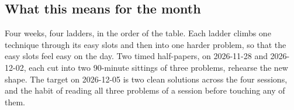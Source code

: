 \subsection*{What this means for the month}

Four weeks, four ladders, in the order of the table. Each ladder climbs one technique through its easy slots and then into one harder problem, so that the easy slots feel easy on the day. Two timed half-papers, on 2026-11-28 and 2026-12-02, each cut into two 90-minute sittings of three problems, rehearse the new shape. The target on 2026-12-05 is two clean solutions across the four sessions, and the habit of reading all three problems of a session before touching any of them.

